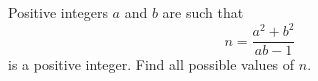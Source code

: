 Positive integers $a$ and $b$ are such that
\[
n=\dfrac{a^2+b^2}{ab-1}
\]
is a positive integer. Find all possible values of $n$.
